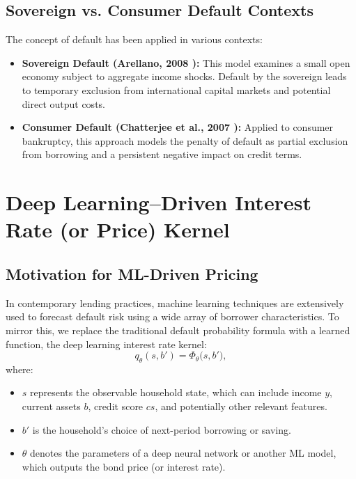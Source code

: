 \documentclass[acmsmall]{acmart}
\begin{document}
\subsection*{Sovereign vs. Consumer Default Contexts}

The concept of default has been applied in various contexts:

\begin{itemize}
    \item \textbf{Sovereign Default (Arellano, 2008 \cite{Arellano2008}):}  This model examines a small open economy subject to aggregate income shocks. Default by the sovereign leads to temporary exclusion from international capital markets and potential direct output costs.
    \item \textbf{Consumer Default (Chatterjee et al., 2007 \cite{Chatterjee2007}):} Applied to consumer bankruptcy, this approach models the penalty of default as partial exclusion from borrowing and a persistent negative impact on credit terms.
\end{itemize}

\section*{Deep Learning–Driven Interest Rate (or Price) Kernel}

\subsection*{Motivation for ML-Driven Pricing}

In contemporary lending practices, machine learning techniques are extensively used to forecast default risk using a wide array of borrower characteristics. To mirror this, we replace the traditional default probability formula with a learned function, the deep learning interest rate kernel:
\begin{equation}
q_\theta(s, b') = \Phi_\theta\bigl(s, b'\bigr),
\end{equation}
where:
\begin{itemize}
    \item $s$ represents the observable household state, which can include income $y$, current assets $b$, credit score $cs$, and potentially other relevant features.
    \item $b'$ is the household's choice of next-period borrowing or saving.
    \item $\theta$ denotes the parameters of a deep neural network or another ML model, which outputs the bond price (or interest rate).
\end{itemize}
\end{document}

